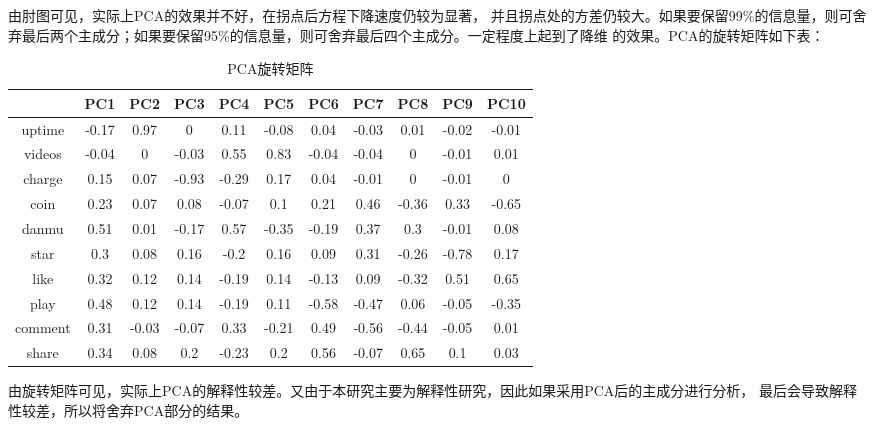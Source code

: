 \documentclass{ctexart}
\begin{document}
由肘图可见，实际上PCA的效果并不好，在拐点后方程下降速度仍较为显著，
并且拐点处的方差仍较大。如果要保留99\%的信息量，则可舍弃最后两个主成分；如果要保留95\%的信息量，则可舍弃最后四个主成分。一定程度上起到了降维
的效果。PCA的旋转矩阵如下表：
\begin{table}[H]
    \centering
    \begin{tabular}{|c|c|c|c|c|c|c|c|c|c|c|}
    \hline
            & PC1   & PC2   & PC3   & PC4   & PC5   & PC6   & PC7   & PC8   & PC9   & PC10  \\ \hline
    uptime  & -0.17 & 0.97  & 0     & 0.11  & -0.08 & 0.04  & -0.03 & 0.01  & -0.02 & -0.01 \\ \hline
    videos  & -0.04 & 0     & -0.03 & 0.55  & 0.83  & -0.04 & -0.04 & 0     & -0.01 & 0.01  \\ \hline
    charge  & 0.15  & 0.07  & -0.93 & -0.29 & 0.17  & 0.04  & -0.01 & 0     & -0.01 & 0     \\ \hline
    coin    & 0.23  & 0.07  & 0.08  & -0.07 & 0.1   & 0.21  & 0.46  & -0.36 & 0.33  & -0.65 \\ \hline
    danmu   & 0.51  & 0.01  & -0.17 & 0.57  & -0.35 & -0.19 & 0.37  & 0.3   & -0.01 & 0.08  \\ \hline
    star    & 0.3   & 0.08  & 0.16  & -0.2  & 0.16  & 0.09  & 0.31  & -0.26 & -0.78 & 0.17  \\ \hline
    like    & 0.32  & 0.12  & 0.14  & -0.19 & 0.14  & -0.13 & 0.09  & -0.32 & 0.51  & 0.65  \\ \hline
    play    & 0.48  & 0.12  & 0.14  & -0.19 & 0.11  & -0.58 & -0.47 & 0.06  & -0.05 & -0.35 \\ \hline
    comment & 0.31  & -0.03 & -0.07 & 0.33  & -0.21 & 0.49  & -0.56 & -0.44 & -0.05 & 0.01  \\ \hline
    share   & 0.34  & 0.08  & 0.2   & -0.23 & 0.2   & 0.56  & -0.07 & 0.65  & 0.1   & 0.03  \\ \hline
    \end{tabular}
    \caption{PCA旋转矩阵}
\end{table}

由旋转矩阵可见，实际上PCA的解释性较差。又由于本研究主要为解释性研究，因此如果采用PCA后的主成分进行分析，
最后会导致解释性较差，所以将舍弃PCA部分的结果。
\end{document}
